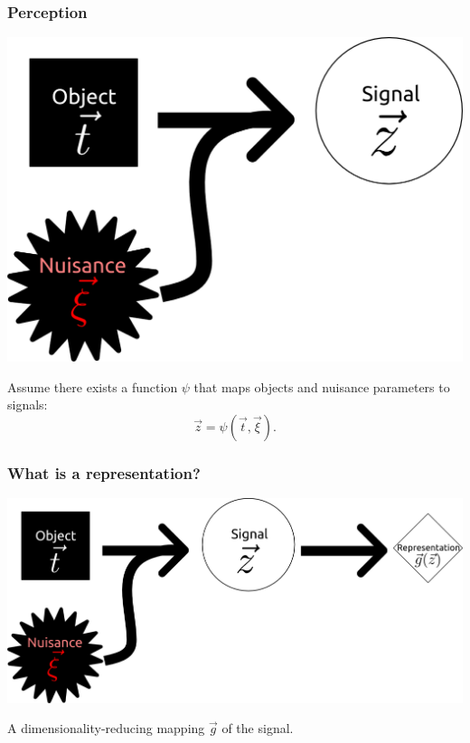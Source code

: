 \documentclass{beamer}
\begin{document}
\begin{frame}
\frametitle{Perception}
\begin{center}
\includegraphics[scale = 0.2]{defense_diagrams/object_signal_nuisance2.png}
\end{center}
Assume there exists a function $\psi$ that maps objects and nuisance parameters to signals:
\[\vec{z} = \psi(\vec{t}, \vec{\xi}).\]
\end{frame}


\begin{frame}
\frametitle{What is a representation?}
\begin{center}
\includegraphics[scale = 0.2]{defense_diagrams/representation1.png}
\end{center}
A dimensionality-reducing mapping $\vec{g}$ of the signal.
\end{frame}
\end{document}
